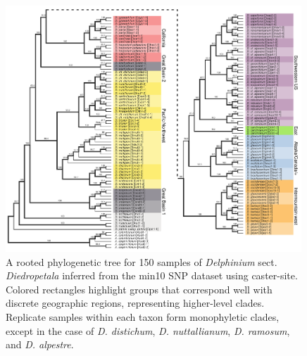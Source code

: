 \documentclass[11pt]{article}
\begin{document}


\begin{figure}[t!]
	\centering
	  \includegraphics[width=0.99\textwidth]{./figures/caster-trees.pdf}	
	\caption{
		A rooted phylogenetic tree for 150 samples of \emph{Delphinium} sect. \emph{Diedropetala}
		inferred from the min10 SNP dataset using caster-site. Colored rectangles highlight
		groups that correspond well with discrete geographic regions, representing higher-level 
		clades. Replicate samples within each taxon form monophyletic clades, except in the case
		of \emph{D. distichum}, \emph{D. nuttallianum}, \emph{D. ramosum}, and \emph{D. alpestre}.
	}
	\label{fig:bigtree}
\end{figure}
\end{document}
